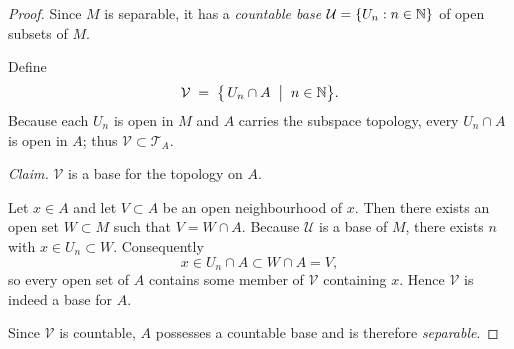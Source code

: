 \documentclass[12pt]{article}
\theoremstyle{definition} %
\theoremstyle{plain} %
\begin{document}
  \begin{proof}
  Since \(M\) is separable, it has a \emph{countable base}  
  \(\mathcal U=\{U_n : n\in\Bbb N\}\) of open subsets of \(M\).
  
  Define
  \[
     \mathcal V \;=\;
     \bigl\{\, U_n\cap A \;\bigm|\; n\in\Bbb N \bigr\}.
  \]
  Because each \(U_n\) is open in \(M\) and \(A\) carries the subspace
  topology, every \(U_n\cap A\) is open in \(A\); thus
  \(\mathcal V\subset\mathcal T_A\).
  
  \medskip
  \textit{Claim.} \(\mathcal V\) is a base for the topology on \(A\).
  
  Let \(x\in A\) and let \(V\subset A\) be an open neighbourhood of \(x\).
  Then there exists an open set \(W\subset M\) such that
  \(V=W\cap A\).
  Because \(\mathcal U\) is a base of \(M\),
  there exists \(n\) with \(x\in U_n\subset W\).
  Consequently
  \[
     x\in U_n\cap A \subset W\cap A = V,
  \]
  so every open set of \(A\) contains some member of \(\mathcal V\)
  containing \(x\).
  Hence \(\mathcal V\) is indeed a base for \(A\).
  
  \medskip
  Since \(\mathcal V\) is countable, \(A\) possesses a countable base and
  is therefore \emph{separable}.
  \end{proof}
\end{document}
